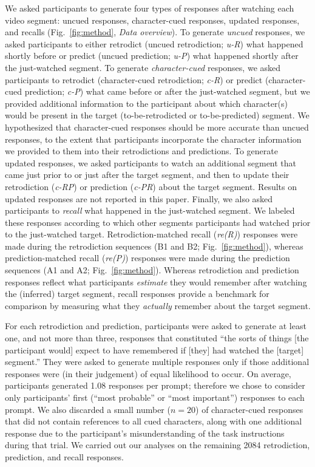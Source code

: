 \documentclass[10pt]{article}
\begin{document}
We asked participants to generate four types of responses after watching each video segment: uncued responses, character-cued responses, updated responses, and recalls (Fig.~\ref{fig:method}, \textit{Data overview}).  To generate \textit{uncued} responses, we asked participants to either retrodict (uncued retrodiction; \textit{u-R}) what happened shortly before or predict (uncued prediction; \textit{u-P}) what happened shortly after the just-watched segment.  To generate \textit{character-cued} responses, we asked participants to retrodict (character-cued retrodiction; \textit{c-R}) or predict (character-cued prediction; \textit{c-P}) what came before or after the just-watched segment, but we provided additional information to the participant about which character(s) would be present in the target (to-be-retrodicted or to-be-predicted) segment.  We hypothesized that character-cued responses should be more accurate than uncued responses, to the extent that participants incorporate the character information we provided to them into their retrodictions and predictions.  To generate updated responses, we asked participants to watch an additional segment that came just prior to or just after the target segment, and then to update their retrodiction (\textit{c-RP}) or prediction (\textit{c-PR}) about the target segment. Results on updated responses are not reported in this paper. Finally, we also asked participants to \textit{recall} what happened in the just-watched segment.  We labeled these responses according to which other segments participants had watched prior to the just-watched target.  Retrodiction-matched recall (\textit{re(R)}) responses were made during the retrodiction sequences (B1 and B2; Fig.~\ref{fig:method}), whereas prediction-matched recall (\textit{re(P)}) responses were made during the prediction sequences (A1 and A2; Fig.~\ref{fig:method}).  Whereas retrodiction and prediction responses reflect what participants \textit{estimate} they would remember after watching the (inferred) target segment, recall responses provide a benchmark for comparison by measuring what they \textit{actually} remember about the target segment.

For each retrodiction and prediction, participants were asked to generate at least one, and not more than three, responses that constituted ``the sorts of things [the participant would] expect to have remembered if [they] had watched the [target] segment.''  They were asked to generate multiple responses only if those additional responses were (in their judgement) of equal likelihood to occur.  On average, participants generated 1.08 responses per prompt; therefore we chose to consider only participants' first (``most probable'' or ``most important'') responses to each prompt.  We also discarded a small number ($n = 20$) of character-cued responses that did not contain references to all cued characters, along with one additional response due to the participant's misunderstanding of the task instructions during that trial.  We carried out our analyses on the remaining 2084 retrodiction, prediction, and recall responses.
\end{document}
